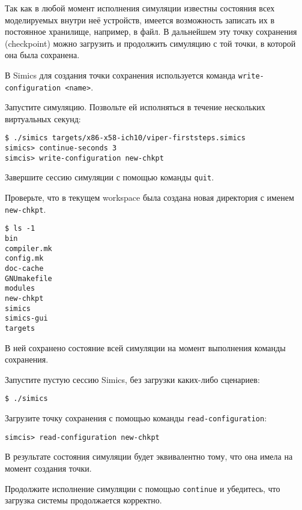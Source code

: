 Так как в любой момент исполнения симуляции известны состояния всех моделируемых внутри неё устройств, имеется возможность записать их в постоянное хранилище, например, в файл. В дальнейшем эту точку сохранения (\abbr checkpoint) можно загрузить и продолжить симуляцию с той точки, в которой она была сохранена.

В Simics для создания точки сохранения используется команда \texttt{write-configuration <name>}.

\begin{itemize*}
    \item Запустите симуляцию. Позвольте ей исполняться в течение нескольких виртуальных секунд:
\begin{lstlisting}
$ ./simics targets/x86-x58-ich10/viper-firststeps.simics
simics> continue-seconds 3
simcis> write-configuration new-chkpt
\end{lstlisting}
    \item Завершите сессию симуляции с помощью команды \texttt{quit}.
    
    \item Проверьте, что в текущем workspace была создана новая директория с именем \texttt{new-chkpt}.
\begin{lstlisting}
$ ls -1
bin
compiler.mk
config.mk
doc-cache
GNUmakefile
modules
new-chkpt
simics
simics-gui
targets    
\end{lstlisting}
В ней сохранено состояние всей симуляции на момент выполнения команды сохранения.
    \item Запустите пустую сессию Simics, без загрузки каких-либо сценариев:
\begin{lstlisting}
$ ./simics
\end{lstlisting}

\item Загрузите точку сохранения с помощью команды \texttt{read-configuration}:
\begin{lstlisting}
simcis> read-configuration new-chkpt
\end{lstlisting}
В результате состояния симуляции будет эквивалентно тому, что она имела на момент создания точки.
\item Продолжите исполнение симуляции с помощью \texttt{continue} и убедитесь, что загрузка системы продолжается корректно.
\end{itemize*}




